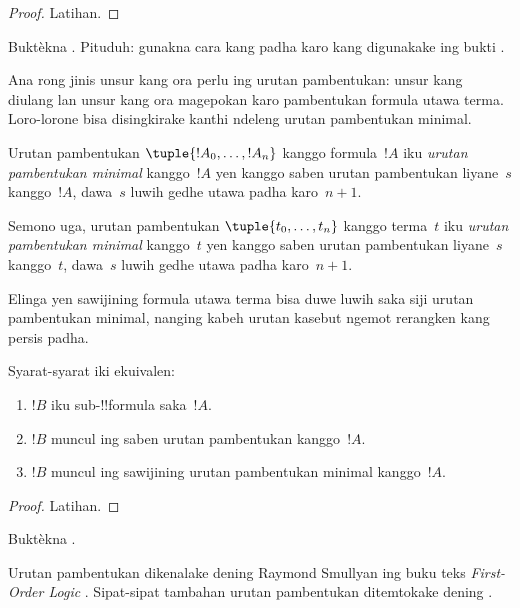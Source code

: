 \documentclass[../../../include/open-logic-section]{subfiles}
\begin{document}
\begin{proof}
Latihan.
\end{proof}

\begin{prob}
Buktèkna .
Pituduh: gunakna cara kang padha karo kang digunakake ing bukti
.
\end{prob}

Ana rong jinis unsur kang ora perlu ing urutan pambentukan:
unsur kang diulang lan unsur kang ora magepokan karo pambentukan
formula utawa terma. Loro-lorone bisa disingkirake kanthi ndeleng
urutan pambentukan minimal.

\begin{defn}
Urutan pambentukan $\tuple{!A_0, \ldots, !A_n}$ kanggo
formula~$!A$ iku \emph{urutan pambentukan minimal} kanggo~$!A$
yen kanggo saben urutan pambentukan liyane~$s$ kanggo~$!A$,
dawa~$s$ luwih gedhe utawa padha karo~$n+1$.

Semono uga, urutan pambentukan $\tuple{t_0, \ldots, t_n}$
kanggo terma~$t$ iku \emph{urutan pambentukan minimal}
kanggo~$t$ yen kanggo saben urutan pambentukan liyane~$s$ kanggo~$t$,
dawa~$s$ luwih gedhe utawa padha karo~$n+1$.
\end{defn}

Elinga yen sawijining formula utawa terma bisa duwe luwih saka
siji urutan pambentukan minimal, nanging kabeh urutan kasebut
ngemot rerangken kang persis padha.

\begin{prop}
Syarat-syarat iki ekuivalen:
\begin{enumerate}
    \item $!B$ iku sub-!!{formula} saka~$!A$.
    \item $!B$ muncul ing saben urutan pambentukan kanggo~$!A$.
    \item $!B$ muncul ing sawijining urutan pambentukan minimal
      kanggo~$!A$.
\end{enumerate}
\end{prop}

\begin{proof}
Latihan.
\end{proof}

\begin{prob}
Buktèkna .
\end{prob}

\begin{history}
Urutan pambentukan dikenalake dening Raymond Smullyan ing
buku teks \emph{First-Order Logic} \citep{Smullyan1968}.
Sipat-sipat tambahan urutan pambentukan ditemtokake dening
\citet{Zuckerman1973}.
\end{history}
\end{document}
